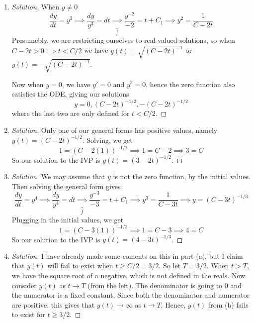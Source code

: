 \documentclass{article}
\begin{document}
\begin{enumerate}
	\item \begin{proof}[Solution]\let\qed\relax
		When $y \neq 0$
		\[
			\frac{dy}{dt} = y^3
			\implies \frac{dy}{y^3} = dt
			\underbrace{\implies}_{\int} \frac{y^{-2}}{-2} = t + C_1
			\implies y^2 = \frac{1}{C - 2t}
		\]
		Presumebly, we are restricting ourselves to real-valued solutions,
		so when $C - 2t > 0 \implies t < C/2$ we have
		$y(t) = \sqrt{(C-2t)^{-1}}$ or $y(t) = -\sqrt{(C-2t)^{-1}}$.

		Now when $y = 0$, we have $y' = 0$ and $y^3 = 0$,
		hence the zero function also satisfies the ODE, giving our solutions
		\[
			y = 0, (C-2t)^{-1/2}, -(C-2t)^{-1/2}
		\]
		where the last two are only defined for $t < C/2$.
	\end{proof}
	\item \begin{proof}[Solution]\let\qed\relax
		Only one of our general forms has positive values,
		namely $y(t) = (C-2t)^{-1/2}$.
		Solving, we get
		\[
			1 = (C-2(1))^{-1/2} \implies 1 = C-2 \implies 3 = C
		\]
		So our solution to the IVP is $y(t) = (3-2t)^{-1/2}$.
	\end{proof}
	\item \begin{proof}[Solution]\let\qed\relax
		We may assume that $y$ is not the zero function, by the initial values.
		Then solving the general form gives
		\[
			\frac{dy}{dt} = y^4 \implies \frac{dy}{y^4} = dt
			\underbrace{\implies}_{\int} \frac{y^{-3}}{-3} = t + C_1
			\implies y^3 = \frac{1}{C-3t} \implies y = (C-3t)^{-1/3}
		\]
		Plugging in the initial values, we get
		\[
			1 = (C - 3(1))^{-1/3} \implies 1 = C - 3 \implies 4 = C
		\]
		So our solution to the IVP is $y(t) = (4 - 3t)^{-1/3}$.
	\end{proof}
	\item \begin{proof}[Solution]\let\qed\relax
		I have already made some coments on this in part (a),
		but I claim that $y(t)$ will fail to exist when $t \geq C/2 = 3/2$.
		So let $T = 3/2$.
		When $t > T$, we have the square root of a negative,
		which is not defined in the reals.
		Now consider $y(t)$ as $t \to T$ (from the left).
		The denominator is going to $0$ and the numerator is a fixed constant.
		Since both the denominator and numerator are positive,
		this gives that $y(t) \to \infty$ as $t \to T$.
		Hence, $y(t)$ from (b) fails to exist for $t \geq 3/2$.
	\end{proof}

\end{enumerate}
\end{document}

